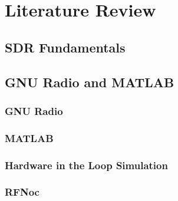 
\chapter{Literature Review} %

\label{Chapter2} %




\section{SDR Fundamentals}


\section{GNU Radio and MATLAB}

\subsection{GNU Radio}

\subsection{MATLAB}

\subsection{Hardware in the Loop Simulation}

\subsection{RFNoc}


